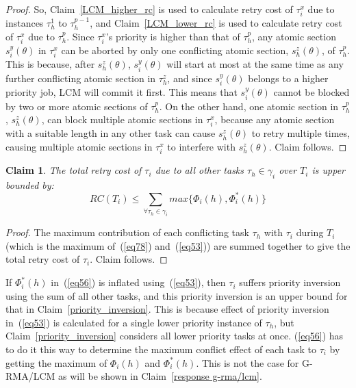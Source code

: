 \documentclass[conference]{IEEEtran}
\newtheorem{clm}{Claim}
\begin{document}
\begin{proof}
So, Claim~\ref{LCM_higher_rc} is used to calculate retry cost of $\tau_{i}^{x}$ due to instances $\tau_{h}^{1}$ to $\tau_{h}^{p-1}$, and Claim~\ref{LCM_lower_rc} is used to calculate retry cost of $\tau_i^x$ due to $\tau_{h}^{p}$. Since $\tau_{i}^{x}$'s priority is higher than that of $\tau_{h}^{p}$, any atomic section $s_{i}^{y}(\theta)$ in $\tau_{i}^{x}$ can be aborted by only one conflicting atomic section, $s_{h}^{z}(\theta)$, of $\tau_{h}^{p}$. This is because, after $s_{h}^{z}(\theta)$, $s_{i}^{y}(\theta)$ will start at most at the same time as any further conflicting atomic section in $\tau_{h}^{z}$, and since $s_{i}^{y}(\theta)$ belongs to a higher priority job, LCM will commit it first. 
This means that $s_i^y(\theta)$ cannot be blocked by two or more atomic sections of $\tau_h^p$. On the other hand, one atomic section in $\tau_{h}^p$, $s_{h}^{z}(\theta)$, can block multiple atomic sections in $\tau_{i}^x$, because any atomic section with a suitable length in any other task can cause $s_{h}^{z}(\theta)$ to retry multiple times, causing
multiple atomic sections in $\tau_{i}^x$ to interfere with $s_{h}^{z}(\theta)$. Claim follows.
\end{proof}

\begin{clm} \label{total costs in $t(T_i)$}
The total retry cost of $\tau_i$ due to all other tasks $\tau_h \in \gamma_i$ over $T_i$ is upper bounded by:
\begin{equation}
RC(T_{i})\le\sum_{\forall \tau_{h}\in\gamma_{i}}max\{\Phi_{i}(h),\Phi_i^*(h)\}
\label{eq56}\end{equation}
\end{clm}

\begin{proof}
The maximum contribution of each conflicting task $\tau_h$ with $\tau_i$ during $T_i$ (which is the maximum of~(\ref{eq78}) and~(\ref{eq53})) are summed together to give the total retry cost of $\tau_i$. Claim follows.
\end{proof}

If $\Phi_i^*(h)$ in~(\ref{eq56}) is inflated using~(\ref{eq53}), then $\tau_i$ suffers priority inversion using the sum of all other tasks, and this priority inversion is an upper bound for that in Claim~\ref{priority_inversion}. This is because effect of priority inversion in~(\ref{eq53}) is calculated for a single lower priority instance of $\tau_h$, but Claim~\ref{priority_inversion} considers all lower priority tasks at once. (\ref{eq56}) has to do it this way to determine the maximum conflict effect of each task to $\tau_i$ by getting the maximum of $\Phi_i(h)$ and $\Phi_i^*(h)$. This is not the case for G-RMA/LCM as will be shown in Claim~\ref{response g-rma/lcm}.
\end{document}
